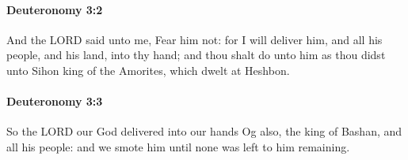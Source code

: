 		\paragraph{Deuteronomy 3:2} %
			\label{DEUTERONOMY-3-2}

			And the LORD said unto me, Fear him not: for I will deliver him, and all his people, and his land, into thy hand; and thou shalt do unto him as thou didst unto Sihon king of the Amorites, which dwelt at Heshbon.


		\paragraph{Deuteronomy 3:3} %
			\label{DEUTERONOMY-3-3}

			So the LORD our God delivered into our hands Og also, the king of Bashan, and all his people: and we smote him until none was left to him remaining.

